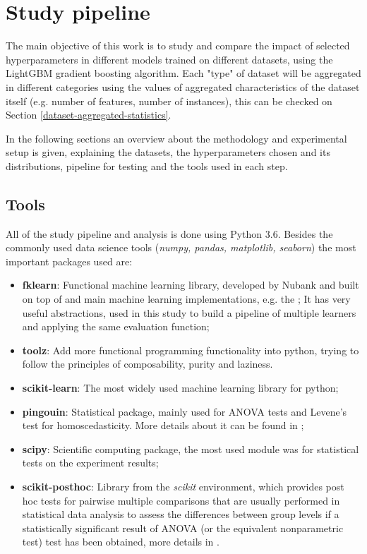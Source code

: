 \chapter{Study pipeline}
\label{cap:study-methodology}

The main objective of this work is to study and compare the impact of selected hyperparameters in different models trained on different datasets, using the LightGBM gradient boosting algorithm. Each "type" of dataset will be aggregated in different categories using the values of aggregated characteristics of the dataset itself (e.g. number of features, number of instances), this can be checked on Section \ref{dataset-aggregated-statistics}.

In the following sections an overview about the methodology and experimental setup is given, explaining the datasets, the hyperparameters chosen and its distributions, pipeline for testing and the tools used in each step.

\section{Tools}

All of the study pipeline and analysis is done using Python 3.6. Besides the commonly used data science tools (\textit{numpy, pandas, matplotlib, seaborn}) the most important packages used are:

\begin{itemize}
    \item \textbf{fklearn}: Functional machine learning library, developed by Nubank and built on top of  and main machine learning implementations, e.g. the ; It has very useful abstractions, used in this study to build a pipeline of multiple learners and applying the same evaluation function;
    \item \textbf{toolz}: Add more functional programming functionality into python, trying to follow the principles of composability, purity and laziness.
    \item \textbf{scikit-learn}: The most widely used machine learning library for python;
    \item \textbf{pingouin}: Statistical package, mainly used for ANOVA tests and Levene's test for homoscedasticity. More details about it can be found in \cite{Vallat2018};
    \item \textbf{scipy}: Scientific computing package, the most used module was  for statistical tests on the experiment results;
    \item \textbf{scikit-posthoc}: Library from the \textit{scikit} environment, which provides post hoc tests for pairwise multiple comparisons that are usually performed in statistical data analysis to assess the differences between group levels if a statistically significant result of ANOVA (or the equivalent nonparametric test) test has been obtained, more details in \cite{Terpilowski2019}.

\end{itemize}

